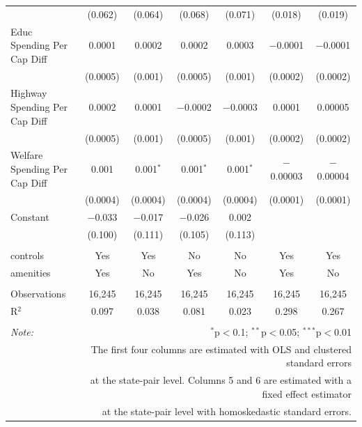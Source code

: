 \documentclass[12pt,a4paper]{article}
\begin{document}
\begin{landscape}
\begin{table}[!htbp]
\begin{tabular}{@{\extracolsep{5pt}}lcccccc}
  & (0.062) & (0.064) & (0.068) & (0.071) & (0.018) & (0.019) \\ 
  Educ Spending Per Cap Diff & 0.0001 & 0.0002 & 0.0002 & 0.0003 & $-$0.0001 & $-$0.0001 \\ 
  & (0.0005) & (0.001) & (0.0005) & (0.001) & (0.0002) & (0.0002) \\ 
  Highway Spending Per Cap Diff & 0.0002 & 0.0001 & $-$0.0002 & $-$0.0003 & 0.0001 & 0.00005 \\ 
  & (0.0005) & (0.001) & (0.0005) & (0.001) & (0.0002) & (0.0002) \\ 
  Welfare Spending Per Cap Diff & 0.001 & 0.001$^{*}$ & 0.001$^{*}$ & 0.001$^{*}$ & $-$0.00003 & $-$0.00004 \\ 
  & (0.0004) & (0.0004) & (0.0004) & (0.0004) & (0.0001) & (0.0001) \\ 
  Constant & $-$0.033 & $-$0.017 & $-$0.026 & 0.002 &  &  \\ 
  & (0.100) & (0.111) & (0.105) & (0.113) &  &  \\ 
 \hline \\[-1.8ex] 
controls & Yes & Yes & No & No & Yes & Yes \\ 
amenities & Yes & No & Yes & No & Yes & No \\ 
\hline \\[-1.8ex] 
Observations & 16,245 & 16,245 & 16,245 & 16,245 & 16,245 & 16,245 \\ 
R$^{2}$ & 0.097 & 0.038 & 0.081 & 0.023 & 0.298 & 0.267 \\ 
\hline 
\hline \\[-1.8ex] 
\textit{Note:}  & \multicolumn{6}{r}{$^{*}$p$<$0.1; $^{**}$p$<$0.05; $^{***}$p$<$0.01} \\ 
 & \multicolumn{6}{r}{The first four columns are estimated with OLS and clustered standard errors} \\ 
 & \multicolumn{6}{r}{at the state-pair level. Columns 5 and 6 are estimated with a fixed effect estimator} \\ 
 & \multicolumn{6}{r}{at the state-pair level with homoskedastic standard errors.} \\ 
\end{tabular} 
\end{table} 
\end{landscape}
\restoregeometry
\end{document}
